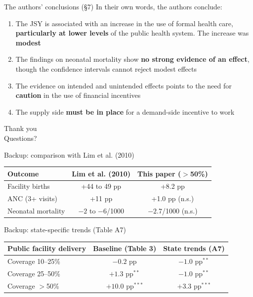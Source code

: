 \documentclass[aspectratio=169,11pt]{beamer}
\begin{document}
\begin{frame}{The authors' conclusions (\S7)}
  In their own words, the authors conclude:
  \begin{enumerate}
    \item The JSY is associated with an increase in the use of formal health care, \textbf{particularly at lower levels} of the public health system. The increase was \textbf{modest}
    \item The findings on neonatal mortality show \textbf{no strong evidence of an effect}, though the confidence intervals cannot reject modest effects
    \item The evidence on intended and unintended effects points to the need for \textbf{caution} in the use of financial incentives
    \item The supply side \textbf{must be in place} for a demand-side incentive to work
  \end{enumerate}
\end{frame}

\begin{frame}
  \begin{center}{\Huge Thank you}\\[1em]{\Large Questions?}\end{center}
\end{frame}

\appendix
\begin{frame}{Backup: comparison with Lim et al. (2010)}
  \centering
  \begin{tabular}{lcc}
    \toprule Outcome & Lim et al. (2010) & This paper ($>$50\%) \\ \midrule
    Facility births & +44 to 49 pp & +8.2 pp \\
    ANC (3+ visits) & +11 pp & +1.0 pp (n.s.) \\
    Neonatal mortality & $-2$ to $-6$/1000 & $-2.7$/1000 (n.s.) \\
    \bottomrule
  \end{tabular}
  \par\vspace{0.6em}{\footnotesize The Lim et al. mortality effect is significant in only two of three methods.}
\end{frame}

\begin{frame}{Backup: state-specific trends (Table A7)}
  \centering
  \begin{tabular}{lcc}
    \toprule Public facility delivery & Baseline (Table 3) & State trends (A7) \\ \midrule
    Coverage 10--25\% & $-0.2$ pp & $-1.0$ pp$^{**}$ \\
    Coverage 25--50\% & $+1.3$ pp$^{**}$ & $-1.0$ pp$^{**}$ \\
    Coverage $>$50\% & $+10.0$ pp$^{***}$ & $+3.3$ pp$^{***}$ \\
    \bottomrule
  \end{tabular}
\end{frame}
\end{document}
